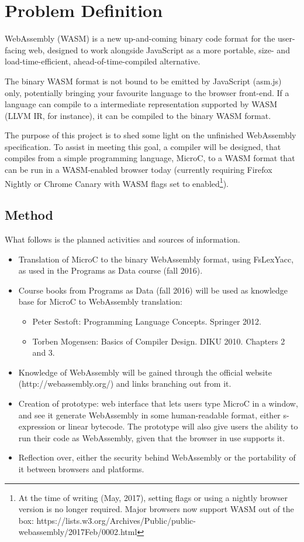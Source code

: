 \documentclass[a4paper]{article}
\makeatletter
\newcommand\footnoteref[1]{\protected@xdef\@thefnmark{\ref{#1}}\@footnotemark}
\makeatother
\begin{document}
\section{Problem Definition}
WebAssembly (WASM) is a new up-and-coming binary code format for the user-facing web, designed to work alongside JavaScript as a more portable, size- and load-time-efficient, ahead-of-time-compiled alternative. 

The binary WASM format is not bound to be emitted by JavaScript (asm.js) only, potentially bringing your favourite language to the browser front-end. If a language can compile to a intermediate representation supported by WASM (LLVM IR, for instance), it can be compiled to the binary WASM format. 

The purpose of this project is to shed some light on the unfinished WebAssembly specification. To assist in meeting this goal, a compiler will be designed, that compiles from a simple programming language, MicroC, to a WASM format that can be run in a WASM-enabled browser today (currently requiring Firefox Nightly or Chrome Canary with WASM flags set to enabled\footnote{At the time of writing (May, 2017), setting flags or using a nightly browser version is no longer required. Major browsers now support WASM out of the box: https://lists.w3.org/Archives/Public/public-webassembly/2017Feb/0002.html}).

\subsection{Method}
What follows is the planned activities and sources of information.
\begin{itemize}
	\item Translation of MicroC to the binary WebAssembly format, using FsLexYacc\footnoteref{footnote:fslexyacc-url}, as used in the Programs as Data course (fall 2016).
	\item Course books from Programs as Data (fall 2016) will be used as knowledge base for MicroC to WebAssembly translation:
		\begin{itemize}
			\item Peter Sestoft: Programming Language Concepts. Springer 2012.
			\item Torben Mogensen: Basics of Compiler Design. DIKU 2010. Chapters 2 and 3.
		\end{itemize}
	\item Knowledge of WebAssembly will be gained through the official website (http://webassembly.org/) and links branching out from it.
	\item Creation of prototype: web interface that lets users type MicroC in a window, and see it generate WebAssembly in some human-readable format, either s-expression or linear bytecode. The prototype will also give users the ability to run their code as WebAssembly, given that the browser in use supports it.
	\item Reflection over, either the security behind WebAssembly or the portability of it between browsers and platforms.
\end{itemize}
\end{document}
